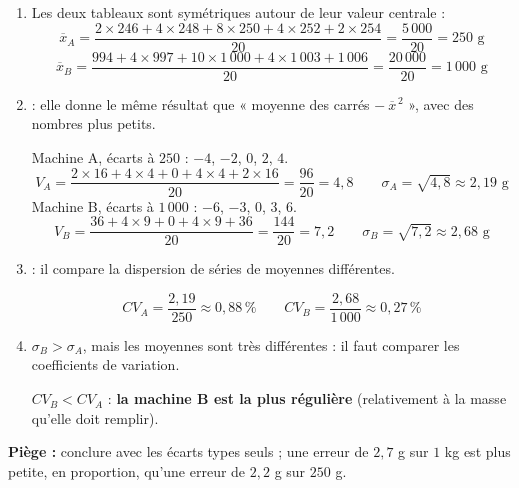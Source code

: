 \begin{enumerate}[itemsep=14pt]
  \item Les deux tableaux sont symétriques autour de leur valeur centrale :
  \[\overline x_A=\dfrac{2\times246+4\times248+8\times250+4\times252+2\times254}{20}=\dfrac{5\,000}{20}=250\text{ g}\]
  \[\overline x_B=\dfrac{994+4\times997+10\times1\,000+4\times1\,003+1\,006}{20}=\dfrac{20\,000}{20}=1\,000\text{ g}\]

  \item
  \begin{prop}
   : elle donne le même résultat que « moyenne des carrés $-\ \overline x^{\,2}$ », avec des nombres plus petits.
  \end{prop}
  Machine A, écarts à $250$ : $-4$, $-2$, $0$, $2$, $4$.
  \[V_A=\dfrac{2\times16+4\times4+0+4\times4+2\times16}{20}=\dfrac{96}{20}=4{,}8\qquad\sigma_A=\sqrt{4{,}8}\approx2{,}19\text{ g}\]
  Machine B, écarts à $1\,000$ : $-6$, $-3$, $0$, $3$, $6$.
  \[V_B=\dfrac{36+4\times9+0+4\times9+36}{20}=\dfrac{144}{20}=7{,}2\qquad\sigma_B=\sqrt{7{,}2}\approx2{,}68\text{ g}\]

  \item
  \begin{prop}
   : il compare la dispersion de séries de moyennes différentes.
  \end{prop}
  \[CV_A=\dfrac{2{,}19}{250}\approx0{,}88\,\%\qquad CV_B=\dfrac{2{,}68}{1\,000}\approx0{,}27\,\%\]

  \item $\sigma_B>\sigma_A$, mais les moyennes sont très différentes : il faut comparer les coefficients de variation.

  $CV_B<CV_A$ : \textbf{la machine B est la plus régulière} (relativement à la masse qu'elle doit remplir).
\end{enumerate}
\textbf{Piège :} conclure avec les écarts types seuls ; une erreur de $2{,}7$ g sur $1$ kg est plus petite, en proportion, qu'une erreur de $2{,}2$ g sur $250$ g.
